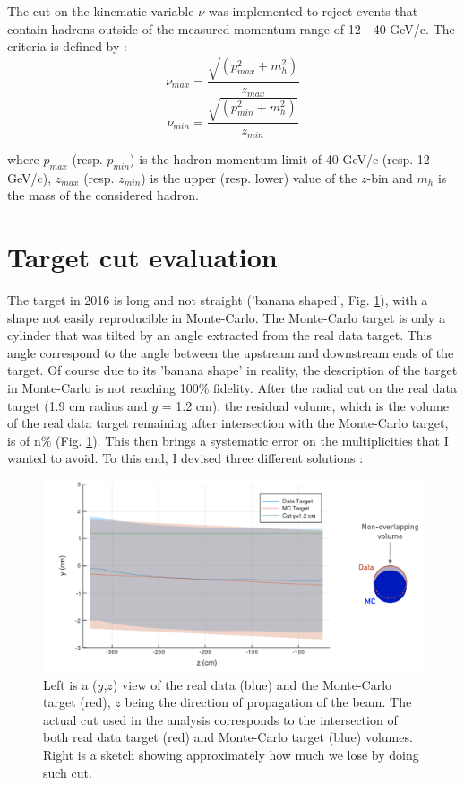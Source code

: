 The cut on the kinematic variable $\nu$ was implemented to reject events that contain hadrons outside of the measured
momentum range of 12 - 40 GeV/c. The criteria is defined by :
\begin{equation}
  \nu_{max} = \frac{\sqrt{(p^2_{max}+m^2_h)}}{z_{max}}
\end{equation}
\begin{equation}
  \nu_{min} = \frac{\sqrt{(p^2_{min}+m^2_h)}}{z_{min}}
\end{equation}

where $p_{max}$ (resp. $p_{min}$) is the hadron momentum limit of 40 GeV/c (resp. 12 GeV/c), $z_{max}$ (resp. $z_{min}$)
is the upper (resp. lower) value of the $z$-bin and $m_h$ is the mass of the considered hadron.


\section{Target cut evaluation}

The target in 2016 is long and not straight ('banana shaped', Fig. \ref{}), with a shape not easily reproducible in Monte-Carlo. The Monte-Carlo target is only a cylinder that was tilted by an angle extracted from the real data target. This angle correspond to the angle between the upstream and downstream ends of the target. Of course due to its 'banana shape' in reality, the description of the target in Monte-Carlo is not reaching 100\% fidelity. After the radial cut on the real data target (1.9 cm radius and $y$ = 1.2 cm), the residual volume, which is the volume of the real data target remaining after intersection with the Monte-Carlo target, is of n\% (Fig. \ref{pic:Target}). This then brings a systematic error on the multiplicities that I wanted to avoid. To this end, I devised three different solutions :

\begin{figure}[!h]
	\includegraphics[scale=0.4]{./gfx/Targetcut.png}
	\caption{Left is a ($y$,$z$) view of the real data (blue) and the Monte-Carlo target (red), $z$ being the direction of propagation of the beam. The actual cut used in the analysis corresponds to the intersection of both real data target (red) and Monte-Carlo target (blue) volumes. Right is a sketch showing approximately how much we lose by doing such cut.}
	\label{pic:Target}
\end{figure}

